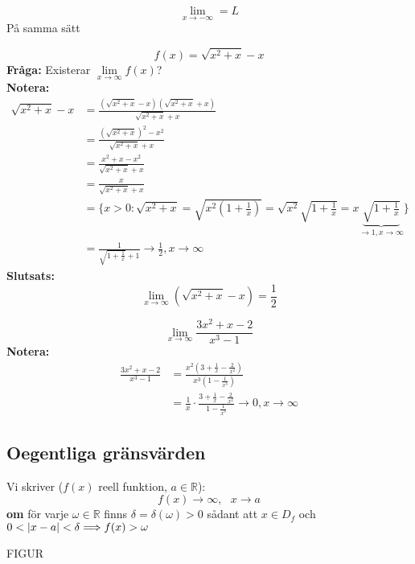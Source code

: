 \[
\lim\limits_{x \to -\infty} = L
\]
På samma sätt

\begin{Ex}
    \[
    f(x) = \sqrt{x^2 + x} - x 
    \]
    \textbf{Fråga: } Existerar $\lim\limits_{x\to \infty}f(x)$?\\
    \textbf{Notera:}
    \begin{align*}
    	\sqrt{x^2 + x} -x &= \frac{(\sqrt{x^2+x}-x)(\sqrt{x^2+x}+x)}{\sqrt{x^2+x}+x}\\
    	&= \frac{(\sqrt{x^2+x})^2 -x^2}{\sqrt{x^2+x}+x}\\
    	&= \frac{x^2+x-x^2}{\sqrt{x^2+x}+x}\\
    	&= \frac{x}{\sqrt{x^2+x}+x}\\
    	&= \{x > 0: \sqrt{x^2 +x} = \sqrt{x^2(1 + \frac{1}{x})} = \sqrt{x^2}\sqrt{1 + \frac{1}{x}} = x \underbrace{\sqrt{1 + \frac{1}{x}}}_{\rightarrow 1, x \rightarrow \infty}\} \\
    	&= \frac{1}{\sqrt{1 + \frac{1}{x}} + 1} \rightarrow \frac{1}{2}, x \rightarrow \infty
    \end{align*}
    \textbf{Slutsats:}
    \[
    \lim\limits_{x \to \infty}(\sqrt{x^2 + x} - x) = \frac{1}{2}
    \]
\end{Ex}
\begin{Ex}
    \[
    \lim\limits_{x \to \infty}\frac{3x^2 + x -2}{x^3-1}
    \]
    \textbf{Notera:}
    \begin{align*}
    	\frac{3x^2+x-2}{x^3-1} &= \frac{x^2(3 + \frac{1}{x} - \frac{2}{x^2})}{x^3(1 - \frac{1}{x^3})}\\
    	&= \frac{1}{x} \cdot \frac{3 + \frac{1}{x} - \frac{2}{x^2}}{1 - \frac{1}{x^3}} \longrightarrow 0, x \rightarrow \infty
    \end{align*}
\end{Ex}

\subsection{Oegentliga gränsvärden} %
\label{sub:oegentliga_gr_nsv_rden}
Vi skriver ($f(x)$ reell funktion, $a \in \mathbb{R}$):
\[
f(x) \rightarrow \infty, \mbox{ } x \rightarrow a
\]
\textbf{om} för varje $\omega \in \mathbb{R}$ finns $\delta = \delta(\omega) > 0$ sådant att $x \in D_f$ och $0 < \lvert x - a\rvert < \delta \Longrightarrow f(x) > \omega$
\begin{center}
	FIGUR
\end{center}

